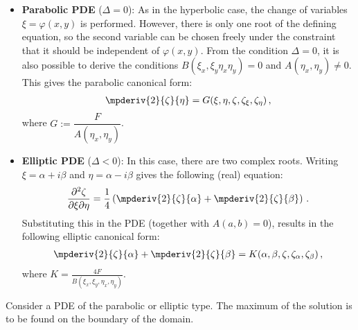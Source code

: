 {\begin{itemize}
                \begin{gather}
                    \label{pde:hyperbolic_canonical_form}
                    \frac{\partial^2\zeta}{\partial\xi\partial\eta} = H(\xi,\eta,\zeta,\zeta_\xi,\zeta_\eta)\,,
                \end{gather}
                where $H := \dfrac{F}{2B(\xi_x,\xi_y,\eta_x,\eta_y)}$.
            \item\textbf{Parabolic PDE} ($\Delta=0$): As in the hyperbolic case, the change of variables $\xi=\varphi(x,y)$ is performed. However, there is only one root of the defining equation, so the second variable can be chosen freely under the constraint that it should be independent of $\varphi(x,y)$. From the condition $\Delta=0$, it is also possible to derive the conditions $B(\xi_x,\xi_y\eta_x\eta_y)=0$ and $A(\eta_x,\eta_y)\neq0$. This gives the parabolic canonical form:
                \begin{gather}
                    \label{pde:parabolic_canonical_form}
                    \mpderiv{2}{\zeta}{\eta} = G(\xi,\eta,\zeta,\zeta_\xi,\zeta_\eta)\,,
                \end{gather}
                where $G := \dfrac{F}{A(\eta_x,\eta_y)}$.
            \item\textbf{Elliptic PDE} ($\Delta<0$): In this case, there are two complex roots. Writing $\xi = \alpha + i\beta$ and $\eta = \alpha - i\beta$ gives the following (real) equation:
            \begin{gather}
                \frac{\partial^2\zeta}{\partial\xi\partial\eta} = \frac{1}{4}\left(\mpderiv{2}{\zeta}{\alpha} + \mpderiv{2}{\zeta}{\beta}\right)\,.
            \end{gather}
            Substituting this in the PDE (together with $A(a,b)=0$), results in the following elliptic canonical form:
                \begin{gather}
                    \label{pde:elliptic_canonical_form}
                    \mpderiv{2}{\zeta}{\alpha} + \mpderiv{2}{\zeta}{\beta} = K(\alpha,\beta,\zeta,\zeta_\alpha,\zeta_\beta)\,,
                \end{gather}
            where $K = \frac{4F}{B(\xi_x,\xi_y,\eta_x,\eta_y)}$.
        \end{itemize}
    }

    \begin{theorem}\label{pde:maximum_principle}
        Consider a PDE of the parabolic or elliptic type. The maximum of the solution is to be found on the boundary of the domain.
    \end{theorem}

